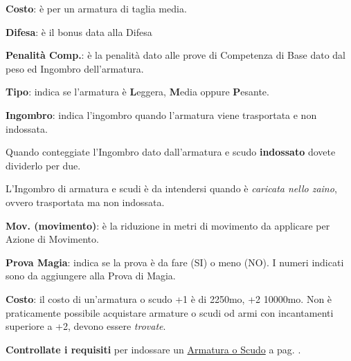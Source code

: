 \begin{multicols}{2}

\medskip

\textbf{Costo}: è per un armatura di taglia media.

\textbf{Difesa}: è il bonus data alla Difesa

\textbf{Penalità Comp.}: è la penalità dato alle prove di Competenza di Base dato dal peso ed Ingombro dell'armatura.

\textbf{Tipo}: indica se l'armatura è \textbf{L}eggera, \textbf{M}edia oppure \textbf{P}esante.

\textbf{Ingombro}: indica l'ingombro quando l'armatura viene trasportata e non indossata.

\begin{changemargin}{0.3cm}{0.3cm}\begin{narratore}
Quando conteggiate l'Ingombro dato dall'armatura e scudo \textbf{indossato} dovete dividerlo per due.

L'Ingombro di armatura e scudi è da intendersi quando è \emph{caricata nello zaino}, ovvero trasportata ma non indossata.
\end{narratore}\end{changemargin}

\textbf{Mov. (movimento)}: è la riduzione in metri di movimento da applicare per Azione di Movimento.

\textbf{Prova Magia}: indica se la prova è da fare (SI) o meno (NO). I numeri indicati sono da aggiungere alla Prova di Magia.

\textbf{Costo}: il costo di un'armatura o scudo +1 è di 2250mo, +2 10000mo. Non è praticamente possibile acquistare armature o scudi od armi con incantamenti superiore a +2, devono essere \emph{trovate}.

\textbf{Controllate i requisiti} per indossare un \hyperlink{indossarearmature}{Armatura o Scudo} a pag. \pageref{indossarearmature}.

\medskip


\end{multicols}
